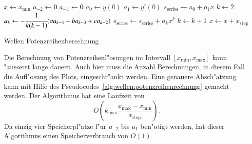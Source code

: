 \begin{algorithm}
	\begin{algorithmic}[1]
		\State $x \gets x_{\text{min}}$
			\State $a_{-2} \gets 0$
			\State $a_{-1} \gets 0$
			\State $a_0 \gets y(0)$
			\State $a_1 \gets y'(0)$
			\State $s_{\text{series}} \gets a_0 + a_1x$
			\State $k \gets 2$
				\State $a_k \gets -\cfrac{1}{k(k-1)}			
				(aa_{k-4}+ba_{k-3}+ca_{k-2})$
				\State $s_{\text{series}} \gets s_{\text{series}} + a_k x^k$
				\State $k \gets k + 1$
			\EndFor
			\State $x \gets x + x_{\text{step}}$
		\EndFor
	\end{algorithmic}
	\caption{Wellen Potenzreihenberechnung} 
	\label{alg:wellen:potenzreihenrechnung}
\end{algorithm}

Die Berechnung von Potenzreihenl"osungen im Intervall
$[x_{\text{min}},x_{\text{max}}]$ kann "ausserst lange dauern. Auch hier muss 
die Anzahl Berechnungen, in diesem Fall die Aufl"osung des Plots, 
eingeschr"ankt werden. Eine genauere Absch"atzung kann mit Hilfe des 
Pseudocodes~\ref{alg:wellen:potenzreihenrechnung} gemacht werden. Der 
Algorithmus hat eine Laufzeit von
\begin{equation*}
	O
	\left(
		k_{\text{max}}\frac{x_{\text{max}}-x_{\text{min}}}{x_{\text{step}}}
	\right).
\end{equation*}
Da einzig vier Speicherpl"atze f"ur $a_{-2}$ bis $a_1$ ben"otigt werden, hat 
dieser Algorithmus einen Speicherverbrauch von $O(1)$.
%

